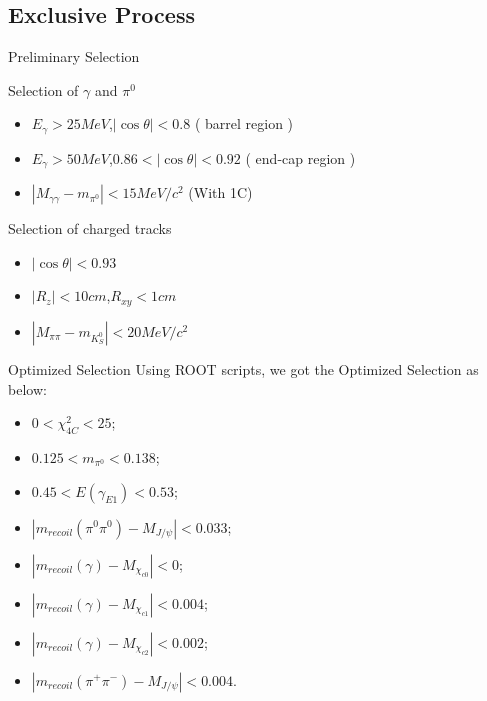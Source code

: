 \documentclass{beamer}
\begin{document}
\subsection{Exclusive Process}
\begin{frame}{Preliminary Selection}
\begin{block}{Selection of $\gamma$ and ${\pi}^0$}
\begin{itemize}
\item $E_{\gamma}>25 MeV$,$|\cos\theta|<0.8$ ( barrel region )
\item $E_{\gamma}>50 MeV$,$0.86<|\cos\theta|<0.92$ ( end-cap region )
\item $|M_{\gamma \gamma}-m_{{\pi}^0}| < 15 MeV/c^2$ (With 1C)
\end{itemize}
\end{block}
\begin{block}{Selection of charged tracks}
\begin{itemize}
\item $ | \cos\theta |<0.93$
\item $|R_{z}|<10cm$,$R_{xy}<1cm$
\item $ |M_{\pi \pi} - m_{K_S^0} | < 20 MeV/c^2$ 
\end{itemize}
\end{block}
\end{frame}
\begin{frame}{Optimized Selection}
Using ROOT scripts, we got the Optimized Selection as below:
\begin{itemize}
\item $0<\chi_{4C}^2<25$;
\item $0.125<m_{\pi^0}<0.138$;
\item $0.45<E(\gamma_{E1})<0.53$;
\item $|m_{recoil}(\pi^0 \pi^0)-M_{J/\psi}|<0.033$;
\item $|m_{recoil}(\gamma)-M_{\chi_{c0}}|<0$;
\item $|m_{recoil}(\gamma)-M_{\chi_{c1}}|<0.004$;
\item $|m_{recoil}(\gamma)-M_{\chi_{c2}}|<0.002$;
\item $|m_{recoil}(\pi^+ \pi^-)-M_{J/\psi}|<0.004$.
\end{itemize}
\end{frame}
\end{document}
